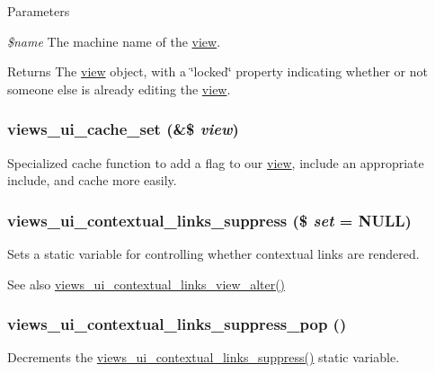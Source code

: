 \begin{DoxyParams}{Parameters}
\item[{\em \$name}]The machine name of the \hyperlink{classview}{view}.\end{DoxyParams}
\begin{DoxyReturn}{Returns}
The \hyperlink{classview}{view} object, with a \char`\"{}locked\char`\"{} property indicating whether or not someone else is already editing the \hyperlink{classview}{view}. 
\end{DoxyReturn}
\hypertarget{views__ui_8module_a7694cbe9024fe6cde4b0c2a9f53fc279}{
\subsubsection[{views\_\-ui\_\-cache\_\-set}]{\setlength{\rightskip}{0pt plus 5cm}views\_\-ui\_\-cache\_\-set (\&\$ {\em view})}}
\label{views__ui_8module_a7694cbe9024fe6cde4b0c2a9f53fc279}
Specialized cache function to add a flag to our \hyperlink{classview}{view}, include an appropriate include, and cache more easily. \hypertarget{views__ui_8module_a5260e8015954411b641445a3389dd5ce}{
\subsubsection[{views\_\-ui\_\-contextual\_\-links\_\-suppress}]{\setlength{\rightskip}{0pt plus 5cm}views\_\-ui\_\-contextual\_\-links\_\-suppress (\$ {\em set} = {\ttfamily NULL})}}
\label{views__ui_8module_a5260e8015954411b641445a3389dd5ce}
Sets a static variable for controlling whether contextual links are rendered.

\begin{DoxySeeAlso}{See also}
\hyperlink{views__ui_8module_a5b9dd769ef8a18413dcf7b3342779947}{views\_\-ui\_\-contextual\_\-links\_\-view\_\-alter()} 
\end{DoxySeeAlso}
\hypertarget{views__ui_8module_ab6dfabb5c82c088831c6ef269c39b4db}{
\subsubsection[{views\_\-ui\_\-contextual\_\-links\_\-suppress\_\-pop}]{\setlength{\rightskip}{0pt plus 5cm}views\_\-ui\_\-contextual\_\-links\_\-suppress\_\-pop ()}}
\label{views__ui_8module_ab6dfabb5c82c088831c6ef269c39b4db}
Decrements the \hyperlink{views__ui_8module_a5260e8015954411b641445a3389dd5ce}{views\_\-ui\_\-contextual\_\-links\_\-suppress()} static variable.

